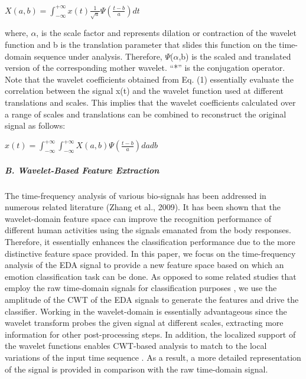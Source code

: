 $X(a,b) = \int_{-\infty}^{+\infty}x(t)\frac{1}{\sqrt{a}} \Psi (\frac{t-b}{a}) dt$\newline

where, $\alpha$, is the scale factor and represents dilation or contraction of the wavelet 
function and b is the translation parameter that slides this function on the 
time-domain sequence under analysis. Therefore, $\Psi$($\alpha$,b) is the scaled and translated 
version of the corresponding mother wavelet. “*” is the conjugation operator.
Note that the wavelet coefficients obtained from Eq. (1) essentially evaluate the 
correlation between the signal x(t) and the wavelet function used at different 
translations and scales. This implies that the wavelet coefficients calculated 
over a range of scales and translations can be combined to reconstruct the original 
signal as follows:

$x(t) = \int_{-\infty}^{+\infty} \int_{-\infty}^{+\infty} X(a,b) \Psi (\frac{t-b}{a}) dadb$\newline

\subparagraph{B. Wavelet-Based Feature Extraction}
The time-frequency analysis of various bio-signals has been addressed in numerous 
related literature \cite{MultKernel2016, FFTSync2017}(Zhang et al., 2009). 
It has been shown that the wavelet-domain feature space can improve the recognition 
performance of different human activities using the signals emanated from the body 
responses. Therefore, it essentially enhances the classification performance due to 
the more distinctive feature space provided. 
In this paper, we focus on the time-frequency analysis of the EDA signal to provide 
a new feature space based on which an emotion classification task can be done. As 
opposed to some related studies that employ the raw time-domain signals for 
classification purposes \cite{ArousalValence2017, EmotionClass2012}, we use the 
amplitude of the CWT of the EDA signals to generate the features and drive the 
classifier. Working in the wavelet-domain is essentially advantageous since the 
wavelet transform probes the given signal at different scales, extracting more 
information for other post-processing steps. In addition, the localized support 
of the wavelet functions enables CWT-based analysis to match to the local variations 
of the input time sequence \cite{WaveletFilter1992}. As a result, a more detailed 
representation of the signal is provided in comparison with the raw time-domain signal.

